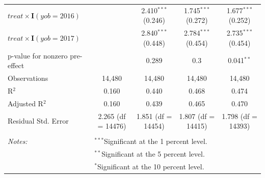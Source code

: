 \begin{table}[H]
\begin{tabular}{@{\extracolsep{5pt}}lcccc}
  $treat \times\mathbf{I}(yob =2016)$ &  & 2.410$^{***}$ (0.246) & 1.745$^{***}$ (0.272) & 1.677$^{***}$ (0.252) \\ 
  $treat \times\mathbf{I}(yob =2017)$ &  & 2.840$^{***}$ (0.448) & 2.784$^{***}$ (0.454) & 2.735$^{***}$ (0.454) \\ 
 p-value for nonzero pre-effect &  & 0.289 & 0.3 & 0.041$^{**}$ \\ 
Observations & 14,480 & 14,480 & 14,480 & 14,480 \\ 
R$^{2}$ & 0.160 & 0.440 & 0.468 & 0.474 \\ 
Adjusted R$^{2}$ & 0.160 & 0.439 & 0.465 & 0.470 \\ 
Residual Std. Error & 2.265 (df = 14476) & 1.851 (df = 14454) & 1.807 (df = 14415) & 1.798 (df = 14393) \\ 
\hline \\[-1.8ex] 
\textit{Notes:} & \multicolumn{4}{l}{$^{***}$Significant at the 1 percent level.} \\ 
 & \multicolumn{4}{l}{$^{**}$Significant at the 5 percent level.} \\ 
 & \multicolumn{4}{l}{$^{*}$Significant at the 10 percent level.} \\ 
\end{tabular} 
\end{table} 
